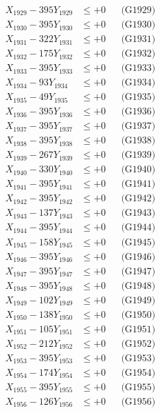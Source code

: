 \documentclass[a4paper,10pt]{article}
\begin{document}
{\begin{align}
X_{1929} - 395Y_{1929} &\leq +0 && \text{(G1929)} \\
X_{1930} - 395Y_{1930} &\leq +0 && \text{(G1930)} \\
\allowbreak
X_{1931} - 322Y_{1931} &\leq +0 && \text{(G1931)} \\
X_{1932} - 175Y_{1932} &\leq +0 && \text{(G1932)} \\
X_{1933} - 395Y_{1933} &\leq +0 && \text{(G1933)} \\
X_{1934} - 93Y_{1934} &\leq +0 && \text{(G1934)} \\
X_{1935} - 49Y_{1935} &\leq +0 && \text{(G1935)} \\
X_{1936} - 395Y_{1936} &\leq +0 && \text{(G1936)} \\
X_{1937} - 395Y_{1937} &\leq +0 && \text{(G1937)} \\
X_{1938} - 395Y_{1938} &\leq +0 && \text{(G1938)} \\
X_{1939} - 267Y_{1939} &\leq +0 && \text{(G1939)} \\
X_{1940} - 330Y_{1940} &\leq +0 && \text{(G1940)} \\
\allowbreak
X_{1941} - 395Y_{1941} &\leq +0 && \text{(G1941)} \\
X_{1942} - 395Y_{1942} &\leq +0 && \text{(G1942)} \\
X_{1943} - 137Y_{1943} &\leq +0 && \text{(G1943)} \\
X_{1944} - 395Y_{1944} &\leq +0 && \text{(G1944)} \\
X_{1945} - 158Y_{1945} &\leq +0 && \text{(G1945)} \\
X_{1946} - 395Y_{1946} &\leq +0 && \text{(G1946)} \\
X_{1947} - 395Y_{1947} &\leq +0 && \text{(G1947)} \\
X_{1948} - 395Y_{1948} &\leq +0 && \text{(G1948)} \\
X_{1949} - 102Y_{1949} &\leq +0 && \text{(G1949)} \\
X_{1950} - 138Y_{1950} &\leq +0 && \text{(G1950)} \\
\allowbreak
X_{1951} - 105Y_{1951} &\leq +0 && \text{(G1951)} \\
X_{1952} - 212Y_{1952} &\leq +0 && \text{(G1952)} \\
X_{1953} - 395Y_{1953} &\leq +0 && \text{(G1953)} \\
X_{1954} - 174Y_{1954} &\leq +0 && \text{(G1954)} \\
X_{1955} - 395Y_{1955} &\leq +0 && \text{(G1955)} \\
X_{1956} - 126Y_{1956} &\leq +0 && \text{(G1956)} \\

\end{align}}
\end{document}
